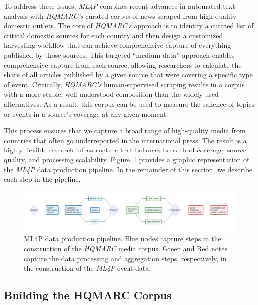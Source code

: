 \documentclass[
  letterpaper,
  DIV=11,
  numbers=noendperiod]{scrartcl}
\begin{document}
To address these issues, \emph{ML4P} combines recent advances in
automated text analysis with \emph{HQMARC's} curated corpus of news
scraped from high-quality domestic outlets. The core of \emph{HQMARC's}
approach is to identify a curated list of critical domestic sources for
each country and then design a customized harvesting workflow that can
achieve comprehensive capture of everything published by those sources.
This targeted ``medium data'' approach enables comprehensive capture
from each source, allowing researchers to calculate the share of all
articles published by a given source that were covering a specific type
of event. Critically, \emph{HQMARC's} human-supervised scraping results
in a corpus with a more stable, well-understood composition than the
widely-used alternatives. As a result, this corpus can be used to
measure the salience of topics or events in a source's coverage at any
given moment.

This process ensures that we capture a broad range of high-quality media
from countries that often go underreported in the international press.
The result is a highly flexible research infrastructure that balances
breadth of coverage, source quality, and processing scalability.
Figure~\ref{fig-mermaid} provides a graphic representation of the
\emph{ML4P} data production pipeline. In the remainder of this section,
we describe each step in the pipeline.

\begin{figure}

{\centering \includegraphics[width=6.77083in,height=\textheight]{mermaid_full.png}

}

\caption{\label{fig-mermaid}ML4P data production pipeline. Blue nodes
capture steps in the construction of the \emph{HQMARC} media corpus.
Green and Red notes capture the data processing and aggregation steps,
respectively, in the construction of the \emph{ML4P} event data.}

\end{figure}

\hypertarget{building-the-hqmarc-corpus}{%
\subsection{Building the HQMARC
Corpus}\label{building-the-hqmarc-corpus}}
\end{document}
